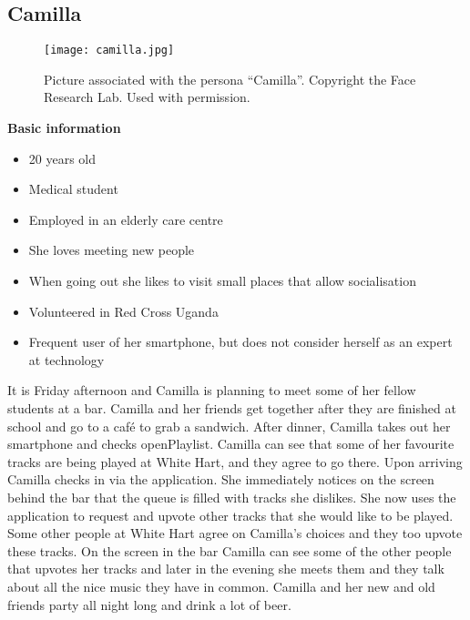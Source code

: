 \subsection{Camilla}
\begin{figure}[hbtp]
  \centering
  \texttt{[image: camilla.jpg]}
  \caption{Picture associated with the persona \enquote{Camilla}. Copyright the Face Research Lab. Used with permission.}\label{fig:camilla}
\end{figure}
\noindent\textbf{Basic information}

\begin{itemize}
\item 20 years old
\item Medical student
\item Employed in an elderly care centre
\item She loves meeting new people
\item When going out she likes to visit small places that allow socialisation
\item Volunteered in Red Cross Uganda
\item Frequent user of her smartphone, but does not consider herself as an expert at technology
\end{itemize}

It is Friday afternoon and Camilla is planning to meet some of her fellow students at a bar. Camilla and her friends get together after they are finished at school and go to a café to grab a sandwich. After dinner, Camilla takes out her smartphone and checks openPlaylist. Camilla can see that some of her favourite tracks are being played at White Hart, and they agree to go there. Upon arriving Camilla checks in via the application. She immediately notices on the screen behind the bar that the queue is filled with tracks she dislikes. She now uses the application to request and upvote other tracks that she would like to be played. Some other people at White Hart agree on Camilla's choices and they too upvote these tracks. On the screen in the bar Camilla can see some of the other people that upvotes her tracks and later in the evening she meets them and they talk about all the nice music they have in common. Camilla and her new and old friends party all night long and drink a lot of beer. 

